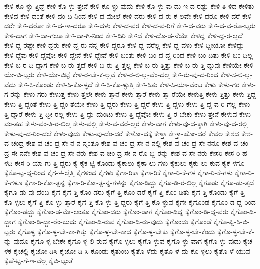 {ಕೇಳಿ-ಕೊ-ಳ್ಳು-ತ್ತಿದ್ದೆ
ಕೇಳಿ-ಕೊ-ಳ್ಳು-ತ್ತೇನೆ
ಕೇಳಿ-ಕೊ-ಳ್ಳು-ವುದು
ಕೇಳಿ-ಕೊ-ಳ್ಳು-ವು-ದು-ಇ-ದ-ರಷ್ಟು
ಕೇಳಿ-ತಿ-ಳಿದ
ಕೇಳಿತು
ಕೇಳಿದ
ಕೇಳಿ-ದಂತೆ
ಕೇಳಿ-ದಂ-ದಿ-ನಿಂದ
ಕೇಳಿ-ದ-ಮೇಲೆ
ಕೇಳಿ-ದರು
ಕೇಳಿ-ದ-ರು-ಕೆ-ಲವೇ
ಕೇಳಿ-ದರೂ
ಕೇಳಿ-ದರೆ
ಕೇಳಿ-ದರೇ
ಕೇಳಿ-ದರೋ
ಕೇಳಿ-ದ-ಳಾ-ದರೂ
ಕೇಳಿ-ದಳು
ಕೇಳಿ-ದ-ವರ
ಕೇಳಿ-ದ-ವ-ರಿಗೆ
ಕೇಳಿ-ದ-ವರು
ಕೇಳಿ-ದ-ವ-ರೊ-ಬ್ಬರು
ಕೇಳಿ-ದಾಗ
ಕೇಳಿ-ದಾ-ಗಲೂ
ಕೇಳಿ-ದಾ-ಗಿ-ನಿಂದ
ಕೇಳಿ-ದಿರಿ
ಕೇಳಿದೆ
ಕೇಳಿ-ದೊ-ಡ-ನೆಯೇ
ಕೇಳಿದ್ದ
ಕೇಳಿ-ದ್ದ-ರ-ಲ್ಲದೆ
ಕೇಳಿ-ದ್ದ-ರಷ್ಟೇ
ಕೇಳಿ-ದ್ದರು
ಕೇಳಿ-ದ್ದ-ರು-ನನ್ನ
ಕೇಳಿ-ದ್ದರೂ
ಕೇಳಿ-ದ್ದ-ವರೆಲ್ಲ
ಕೇಳಿ-ದ್ದ-ವಳು
ಕೇಳಿ-ದ್ದೀಯೋ
ಕೇಳಿದ್ದು
ಕೇಳಿ-ದ್ದೆವು
ಕೇಳಿ-ದ್ದೆವೋ
ಕೇಳಿ-ದ್ದೇನೆ
ಕೇಳಿ-ದ್ದೇವೆ
ಕೇಳಿ-ಬಂತು
ಕೇಳಿ-ಬಂ-ದ-ದ್ದ-ರಿಂದ
ಕೇಳಿ-ಬಂ-ದಿತು
ಕೇಳಿ-ಬಂ-ದಿಲ್ಲ
ಕೇಳಿ-ಬ-ರ-ದಿ-ದ್ದಾಗ
ಕೇಳಿ-ಬ-ರು-ತ್ತದೆ
ಕೇಳಿ-ಬ-ರು-ತ್ತಿ-ತ್ತಲ್ಲ
ಕೇಳಿ-ಬ-ರು-ತ್ತಿತ್ತು
ಕೇಳಿ-ಬ-ರು-ತ್ತಿ-ದ್ದುವು
ಕೇಳಿಯೇ
ಕೇಳಿ-ಯೇ-ಬಿ-ಟ್ಟರು
ಕೇಳಿ-ಯೇ-ಬಿಟ್ಟೆ
ಕೇಳಿ-ರ-ಬೇ-ಕ-ಲ್ಲವೆ
ಕೇಳಿ-ರ-ಲಿ-ಲ್ಲ-ವೆಂ-ದಲ್ಲ
ಕೇಳಿ-ರು-ವು-ದ-ರಿಂದ
ಕೇಳಿ-ಸ-ಲಿ-ಲ್ಲ-ವೆದು
ಕೇಳಿ-ಸಿ-ಕೊಂಡು
ಕೇಳಿ-ಸಿ-ಕೊ-ಳ್ಳದೆ
ಕೇಳಿ-ಸಿ-ಕೊ-ಳ್ಳುತ್ತಿ
ಕೇಳಿ-ಸಿತು
ಕೇಳಿ-ಸಿ-ಯಾ-ವೆಂಬ
ಕೇಳು
ಕೇಳು-ಗರ
ಕೇಳು-ಗ-ರನ್ನು
ಕೇಳು-ಗರು
ಕೇಳುತ್ತ
ಕೇಳು-ತ್ತಲೇ
ಕೇಳು-ತ್ತಾನೆ
ಕೇಳು-ತ್ತಾರೆ
ಕೇಳು-ತ್ತಾ-ರೆಯೇ
ಕೇಳುತ್ತಿ
ಕೇಳು-ತ್ತಿತ್ತು
ಕೇಳು-ತ್ತಿದ್ದ
ಕೇಳು-ತ್ತಿ-ದ್ದಂತೆ
ಕೇಳು-ತ್ತಿ-ದ್ದಂ-ತೆಯೇ
ಕೇಳು-ತ್ತಿ-ದ್ದರು
ಕೇಳು-ತ್ತಿ-ದ್ದರೆ
ಕೇಳು-ತ್ತಿ-ದ್ದಳು
ಕೇಳು-ತ್ತಿ-ದ್ದ-ವ-ರಿ-ಗೆಲ್ಲ
ಕೇಳು-ತ್ತಿ-ದ್ದಾರೆ
ಕೇಳು-ತ್ತಿ-ದ್ದೀ-ರಲ್ಲ
ಕೇಳು-ತ್ತಿ-ದ್ದು-ದುಂಟು
ಕೇಳು-ತ್ತಿ-ದ್ದೆವೋ
ಕೇಳು-ತ್ತಿ-ರ-ಬೇಕು
ಕೇಳು-ತ್ತೇನೆ
ಕೇಳುವ
ಕೇಳು-ವಂ-ತಹ
ಕೇಳು-ವಂ-ತಿ-ರ-ಲಿಲ್ಲ
ಕೇಳು-ವಲ್ಲಿ
ಕೇಳು-ವ-ವರೆ-ಲ್ಲರ
ಕೇಳು-ವಾಗ
ಕೇಳು-ವು-ದ-ಕ್ಕಾಗಿ
ಕೇಳು-ವು-ದ-ರಲ್ಲಿ
ಕೇಳು-ವು-ದ-ರಿಂ-ದಲೆ
ಕೇಳು-ವುದು
ಕೇಳು-ವು-ದೆಂ-ದರೆ
ಕೇಳೋ-ದಕ್ಕೆ
ಕೇಳ್ತಾ
ಕೇಳ್ತಾ-ಹೋ-ದರೆ
ಕೇವಲ
ಕೇಶದ
ಕೇಶ-ವ-ಚಂದ್ರ
ಕೇಶ-ವ-ಚಂ-ದ್ರ-ಸೇ-ನ-ನ-ನ್ನಂತೂ
ಕೇಶ-ವ-ಚಂ-ದ್ರ-ಸೇ-ನ-ನಲ್ಲಿ
ಕೇಶ-ವ-ಚಂ-ದ್ರ-ಸೇ-ನನೂ
ಕೇಶ-ವ-ಚಂ-ದ್ರ-ಸೇ-ನನೇ
ಕೇಶ-ವ-ಚಂ-ದ್ರ-ಸೇ-ನರು
ಕೇಶ-ವ-ಚಂ-ದ್ರ-ಸೇ-ನ-ರೊ-ಬ್ಬ-ರನ್ನು
ಕೇಶ-ವ-ಸೇ-ನರು
ಕೇಸರಿ
ಕೇಸ-ರಿ-ಹ-ಳದಿ
ಕೇಸ-ರಿ-ಯಾ-ಗು-ತ್ತಿ-ದ್ದರು
ಕೈ
ಕೈಕ-ಟ್ಟಿ-ಕೊಂಡು
ಕೈಕಾಲು
ಕೈಕಾ-ಲು-ಗಳು
ಕೈಕುಲು
ಕೈಕು-ಲು-ಕುವ
ಕೈಕೆ-ಳಗೂ
ಕೈಕೊ-ಟ್ಟ-ದ್ದ-ರಿಂದ
ಕೈಗ-ಳ-ಲ್ಲೆತ್ತಿ
ಕೈಗಳಿಂದ
ಕೈಗಳು
ಕೈಗಾ-ರಿಕಾ
ಕೈಗಾ-ರಿಕೆ
ಕೈಗಾ-ರಿ-ಕೆ-ಗಳ
ಕೈಗಾ-ರಿ-ಕೆ-ಗಳು
ಕೈಗಾ-ರಿ-ಕೆ-ಗಳೂ
ಕೈಗಾ-ರಿ-ಕೋ-ತ್ಪನ್ನ
ಕೈಗಾ-ರಿ-ಕೋ-ತ್ಪ-ನ್ನ-ಗಳನ್ನು
ಕೈಗೂ-ಡಿದ್ದು
ಕೈಗೂ-ಡಿ-ರ-ಲಿಲ್ಲ
ಕೈಗೂಡು
ಕೈಗೂ-ಡು-ತ್ತದೆ
ಕೈಗೂ-ಡು-ವು-ದೆಂಬ
ಕೈಗೆ
ಕೈಗೆ-ತ್ತಿ-ಕೊಂ-ಡರು
ಕೈಗೆ-ತ್ತಿ-ಕೊಂ-ಡರೆ
ಕೈಗೆ-ತ್ತಿ-ಕೊಂ-ಡಿತು
ಕೈಗೆ-ತ್ತಿ-ಕೊಂಡು
ಕೈಗೆ-ತ್ತಿ-ಕೊ-ಳ್ಳಲು
ಕೈಗೆ-ತ್ತಿ-ಕೊ-ಳ್ಳು-ತ್ತಾರೆ
ಕೈಗೆ-ತ್ತಿ-ಕೊ-ಳ್ಳು-ತ್ತಿ-ದ್ದರು
ಕೈಗೆ-ತ್ತಿ-ಕೊ-ಳ್ಳುವ
ಕೈಗೇ
ಕೈಗೊಂಡ
ಕೈಗೊಂ-ಡ-ದ್ದ-ರಿಂದ
ಕೈಗೊಂ-ಡದ್ದು
ಕೈಗೊಂ-ಡ-ಮೇ-ಲಂತೂ
ಕೈಗೊಂ-ಡರು
ಕೈಗೊಂ-ಡಾಗ
ಕೈಗೊಂ-ಡಿದ್ದ
ಕೈಗೊಂ-ಡಿ-ದ್ದ-ವರು
ಕೈಗೊಂ-ಡಿ-ದ್ದಾಗ
ಕೈಗೊಂ-ಡಿ-ದ್ದಾ-ರೆಂ-ಬುದು
ಕೈಗೊಂ-ಡಿ-ರುವ
ಕೈಗೊಂ-ಡಿ-ರು-ವುದು
ಕೈಗೊಂಡು
ಕೈಗೊಂಡೆ
ಕೈಗೊ-ಪ್ಪಿ-ಸಿ-ಬಿ-ಟ್ಟರು
ಕೈಗೊಳ್ಳ
ಕೈಗೊ-ಳ್ಳ-ಬೇ-ಕಾ-ಗಿತ್ತು
ಕೈಗೊ-ಳ್ಳ-ಬೇ-ಕಾದ
ಕೈಗೊ-ಳ್ಳ-ಬೇಕು
ಕೈಗೊ-ಳ್ಳ-ಬೇ-ಕೆಂದು
ಕೈಗೊ-ಳ್ಳ-ಬೇ-ಕೆ-ನ್ನು-ವುದೂ
ಕೈಗೊ-ಳ್ಳ-ಬೇಕೇ
ಕೈಗೊ-ಳ್ಳ-ಲಿ-ರುವ
ಕೈಗೊ-ಳ್ಳಲು
ಕೈಗೊ-ಳ್ಳುವ
ಕೈಗೊ-ಳ್ಳು-ವಾಗ
ಕೈಗೊ-ಳ್ಳು-ವುದು
ಕೈಚ-ಳಕ
ಕೈಚೆಲ್ಲಿ
ಕೈಜೋ-ಡಿಸಿ
ಕೈಜೋ-ಡಿ-ಸಿ-ಕೊಂಡು
ಕೈತುಂಬ
ಕೈತೊ-ಳೆದು
ಕೈತೊ-ಳೆ-ದು-ಕೊ-ಳ್ಳಲು
ಕೈತೊ-ಳೆ-ಯುವ
ಕೈಪೆ-ಟ್ಟಿ-ಗೆ-ಇ-ವೆಲ್ಲ
ಕೈಬಿ-ಟ್ಟಂತೆ
}
